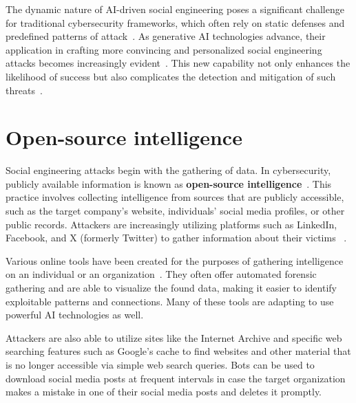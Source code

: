 %
%
The dynamic nature of AI-driven social engineering poses a significant challenge for traditional cybersecurity frameworks, which often rely on static defenses and predefined patterns of attack~\citep{fakhouri_AI_Driven_Solutions_SE_Attacks_2024}. As generative AI technologies advance, their application in crafting more convincing and personalized social engineering attacks becomes increasingly evident~\citep{blauth_AI_Crime_Overview_Malicious_Use_Abuse_2022}. This new capability not only enhances the likelihood of success but also complicates the detection and mitigation of such threats~\citep{mirsky_Threat_Offensive_AI_Organizations_2023}.











\section{Open-source intelligence}
\begin{comment}
Some case studies highlighting the use of OSINT in real-world social engineering incidents?
\end{comment}

Social engineering attacks begin with the gathering of data. In cybersecurity, publicly available information is known as \textbf{open-source intelligence}~\citep{hadnagy_Social_Engineering_The_Science_2018}. This practice involves collecting intelligence from sources that are publicly accessible, such as the target company's website, individuals' social media profiles, or other public records. Attackers are increasingly utilizing platforms such as LinkedIn, Facebook, and X (formerly Twitter) to gather information about their victims ~\citep{fakhouri_AI_Driven_Solutions_SE_Attacks_2024}.

Various online tools have been created for the purposes of gathering intelligence on an individual or an organization~\citep{mirsky_Threat_Offensive_AI_Organizations_2023}. They often offer automated forensic gathering and are able to visualize the found data, making it easier to identify exploitable patterns and connections. Many of these tools are adapting to use powerful AI technologies as well.

Attackers are also able to utilize sites like the Internet Archive and specific web searching features such as Google’s cache to find websites and other material that is no longer accessible via simple web search queries. Bots can be used to download social media posts at frequent intervals in case the target organization makes a mistake in one of their social media posts and deletes it promptly.

